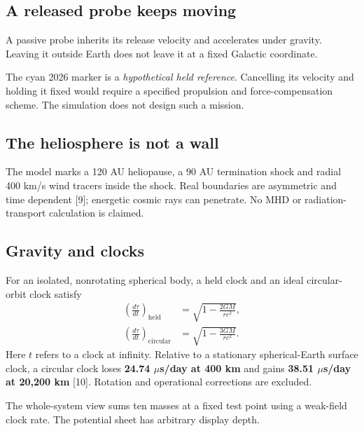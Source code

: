 \begin{minipage}[t]{.485\linewidth}\vspace{0pt}\setlength{\parskip}{3pt}
\subsection*{A released probe keeps moving}
A passive probe inherits its release velocity and accelerates under gravity. Leaving it outside Earth does not leave it at a fixed Galactic coordinate.

The cyan 2026 marker is a \emph{hypothetical held reference}. Cancelling its velocity and holding it fixed would require a specified propulsion and force-compensation scheme. The simulation does not design such a mission.
\subsection*{The heliosphere is not a wall}
The model marks a 120 AU heliopause, a 90 AU termination shock and radial 400 km/s wind tracers inside the shock. Real boundaries are asymmetric and time dependent [9]; energetic cosmic rays can penetrate. No MHD or radiation-transport calculation is claimed.
\end{minipage}\hfill
\begin{minipage}[t]{.485\linewidth}\vspace{0pt}\setlength{\parskip}{3pt}
\subsection*{Gravity and clocks}
For an isolated, nonrotating spherical body, a held clock and an ideal circular-orbit clock satisfy
\begin{align}
 \left(\frac{d\tau}{dt}\right)_{\!\mathrm{held}}&=\sqrt{1-\frac{2GM}{rc^2}},\\
 \left(\frac{d\tau}{dt}\right)_{\!\mathrm{circular}}&=\sqrt{1-\frac{3GM}{rc^2}}.
\end{align}
Here $t$ refers to a clock at infinity. Relative to a stationary spherical-Earth surface clock, a circular clock loses \textbf{24.74 $\mu$s/day at 400 km} and gains \textbf{38.51 $\mu$s/day at 20,200 km} [10]. Rotation and operational corrections are excluded.

The whole-system view sums ten masses at a fixed test point using a weak-field clock rate. The potential sheet has arbitrary display depth.
\end{minipage}

